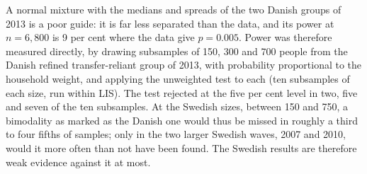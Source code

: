 A normal mixture with the medians and spreads of the two Danish groups of 2013 is a poor guide: it is far less separated than the data, and its power at $n=6{,}800$ is 9 per cent where the data give $p=0.005$. Power was therefore measured directly, by drawing subsamples of 150, 300 and 700 people from the Danish refined transfer-reliant group of 2013, with probability proportional to the household weight, and applying the unweighted test to each (ten subsamples of each size, run within LIS). The test rejected at the five per cent level in two, five and seven of the ten subsamples. At the Swedish sizes, between 150 and 750, a bimodality as marked as the Danish one would thus be missed in roughly a third to four fifths of samples; only in the two larger Swedish waves, 2007 and 2010, would it more often than not have been found. The Swedish results are therefore weak evidence against it at most.